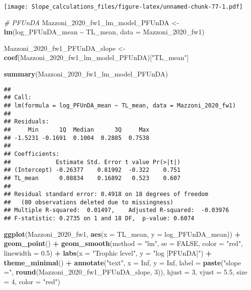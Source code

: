 \documentclass[
]{article}
\newenvironment{Shaded}{\begin{snugshade}}{\end{snugshade}}
\newcommand{\AttributeTok}[1]{\textcolor[rgb]{0.13,0.29,0.53}{#1}}
\newcommand{\CommentTok}[1]{\textcolor[rgb]{0.56,0.35,0.01}{\textit{#1}}}
\newcommand{\ConstantTok}[1]{\textcolor[rgb]{0.56,0.35,0.01}{#1}}
\newcommand{\DecValTok}[1]{\textcolor[rgb]{0.00,0.00,0.81}{#1}}
\newcommand{\FloatTok}[1]{\textcolor[rgb]{0.00,0.00,0.81}{#1}}
\newcommand{\FunctionTok}[1]{\textcolor[rgb]{0.13,0.29,0.53}{\textbf{#1}}}
\newcommand{\NormalTok}[1]{#1}
\newcommand{\OtherTok}[1]{\textcolor[rgb]{0.56,0.35,0.01}{#1}}
\newcommand{\SpecialCharTok}[1]{\textcolor[rgb]{0.81,0.36,0.00}{\textbf{#1}}}
\newcommand{\StringTok}[1]{\textcolor[rgb]{0.31,0.60,0.02}{#1}}
\begin{document}
\texttt{[image: Slope\_calculations\_files/figure-latex/unnamed-chunk-77-1.pdf]}

\begin{Shaded}
\begin{Highlighting}[]
\CommentTok{\# PFUnDA}
\NormalTok{Mazzoni\_2020\_fw1\_lm\_model\_PFUnDA }\OtherTok{\textless{}{-}} \FunctionTok{lm}\NormalTok{(log\_PFUnDA\_mean }\SpecialCharTok{\textasciitilde{}}\NormalTok{ TL\_mean,}
                                      \AttributeTok{data =}\NormalTok{ Mazzoni\_2020\_fw1)}

\NormalTok{Mazzoni\_2020\_fw1\_PFUnDA\_slope }\OtherTok{\textless{}{-}} \FunctionTok{coef}\NormalTok{(Mazzoni\_2020\_fw1\_lm\_model\_PFUnDA)[}\StringTok{"TL\_mean"}\NormalTok{]}

\FunctionTok{summary}\NormalTok{(Mazzoni\_2020\_fw1\_lm\_model\_PFUnDA)}
\end{Highlighting}
\end{Shaded}

\begin{verbatim}
## 
## Call:
## lm(formula = log_PFUnDA_mean ~ TL_mean, data = Mazzoni_2020_fw1)
## 
## Residuals:
##     Min      1Q  Median      3Q     Max 
## -1.5231 -0.1691  0.1004  0.2885  0.7538 
## 
## Coefficients:
##             Estimate Std. Error t value Pr(>|t|)
## (Intercept) -0.26377    0.81992  -0.322    0.751
## TL_mean      0.08834    0.16892   0.523    0.607
## 
## Residual standard error: 0.4918 on 18 degrees of freedom
##   (80 observations deleted due to missingness)
## Multiple R-squared:  0.01497,    Adjusted R-squared:  -0.03976 
## F-statistic: 0.2735 on 1 and 18 DF,  p-value: 0.6074
\end{verbatim}

\begin{Shaded}
\begin{Highlighting}[]
\FunctionTok{ggplot}\NormalTok{(Mazzoni\_2020\_fw1, }\FunctionTok{aes}\NormalTok{(}\AttributeTok{x =}\NormalTok{ TL\_mean, }\AttributeTok{y =}\NormalTok{ log\_PFUnDA\_mean)) }\SpecialCharTok{+}
  \FunctionTok{geom\_point}\NormalTok{() }\SpecialCharTok{+}
  \FunctionTok{geom\_smooth}\NormalTok{(}\AttributeTok{method =} \StringTok{"lm"}\NormalTok{, }\AttributeTok{se =} \ConstantTok{FALSE}\NormalTok{, }\AttributeTok{color =} \StringTok{"red"}\NormalTok{, }\AttributeTok{linewidth =} \FloatTok{0.5}\NormalTok{) }\SpecialCharTok{+}
  \FunctionTok{labs}\NormalTok{(}\AttributeTok{x =} \StringTok{"Trophic level"}\NormalTok{,}
       \AttributeTok{y =} \StringTok{"log [PFUnDA]"}\NormalTok{) }\SpecialCharTok{+}
  \FunctionTok{theme\_minimal}\NormalTok{() }\SpecialCharTok{+}
  \FunctionTok{annotate}\NormalTok{(}\StringTok{"text"}\NormalTok{, }\AttributeTok{x =} \ConstantTok{Inf}\NormalTok{, }\AttributeTok{y =} \ConstantTok{Inf}\NormalTok{, }\AttributeTok{label =} \FunctionTok{paste}\NormalTok{(}\StringTok{"slope ="}\NormalTok{, }\FunctionTok{round}\NormalTok{(Mazzoni\_2020\_fw1\_PFUnDA\_slope, }\DecValTok{3}\NormalTok{)), }
           \AttributeTok{hjust =} \DecValTok{3}\NormalTok{, }\AttributeTok{vjust =} \FloatTok{5.5}\NormalTok{, }\AttributeTok{size =} \DecValTok{4}\NormalTok{, }\AttributeTok{color =} \StringTok{"red"}\NormalTok{)}
\end{Highlighting}
\end{Shaded}
\end{document}
